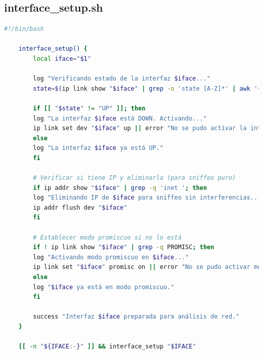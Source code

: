 \documentclass[11pt,a4paper,twoside]{report}
\begin{document}
\subsection*{interface\_setup.sh}
\begin{lstlisting}[language=bash, caption={\texttt{interface\_setup.sh}}, label={lst:interface-setup}]
	#!/bin/bash
	
	interface_setup() {
		local iface="$1"
		
		log "Verificando estado de la interfaz $iface..."
		state=$(ip link show "$iface" | grep -o 'state [A-Z]*' | awk '{print $2}')
		
		if [[ "$state" != "UP" ]]; then
		log "La interfaz $iface está DOWN. Activando..."
		ip link set dev "$iface" up || error "No se pudo activar la interfaz $iface."
		else
		log "La interfaz $iface ya está UP."
		fi
		
		# Verificar si tiene IP y eliminarla (para sniffeo puro)
		if ip addr show "$iface" | grep -q 'inet '; then
		log "Eliminando IP de $iface para sniffeo sin interferencias..."
		ip addr flush dev "$iface"
		fi
		
		# Establecer modo promiscuo si no lo está
		if ! ip link show "$iface" | grep -q PROMISC; then
		log "Activando modo promiscuo en $iface..."
		ip link set "$iface" promisc on || error "No se pudo activar modo promiscuo en $iface."
		else
		log "$iface ya está en modo promiscuo."
		fi
		
		success "Interfaz $iface preparada para análisis de red."
	}
	
	[[ -n "${IFACE:-}" ]] && interface_setup "$IFACE"
\end{lstlisting}
\end{document}
